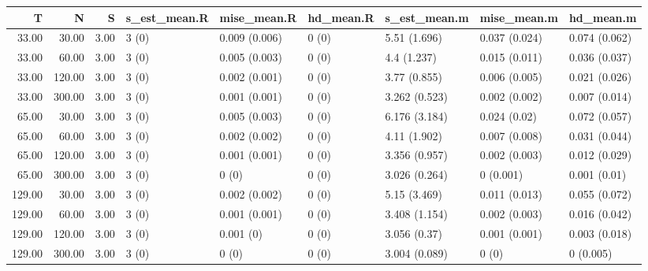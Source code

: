 \begin{table}[ht]
\centering
\begin{tabular}{rrrllllll}
  \hline
T & N & S & s\_est\_mean.R & mise\_mean.R & hd\_mean.R & s\_est\_mean.m & mise\_mean.m & hd\_mean.m \\ 
  \hline
33.00 & 30.00 & 3.00 & 3 (0) & 0.009 (0.006) & 0 (0) & 5.51 (1.696) & 0.037 (0.024) & 0.074 (0.062) \\ 
  33.00 & 60.00 & 3.00 & 3 (0) & 0.005 (0.003) & 0 (0) & 4.4 (1.237) & 0.015 (0.011) & 0.036 (0.037) \\ 
  33.00 & 120.00 & 3.00 & 3 (0) & 0.002 (0.001) & 0 (0) & 3.77 (0.855) & 0.006 (0.005) & 0.021 (0.026) \\ 
  33.00 & 300.00 & 3.00 & 3 (0) & 0.001 (0.001) & 0 (0) & 3.262 (0.523) & 0.002 (0.002) & 0.007 (0.014) \\ 
  65.00 & 30.00 & 3.00 & 3 (0) & 0.005 (0.003) & 0 (0) & 6.176 (3.184) & 0.024 (0.02) & 0.072 (0.057) \\ 
  65.00 & 60.00 & 3.00 & 3 (0) & 0.002 (0.002) & 0 (0) & 4.11 (1.902) & 0.007 (0.008) & 0.031 (0.044) \\ 
  65.00 & 120.00 & 3.00 & 3 (0) & 0.001 (0.001) & 0 (0) & 3.356 (0.957) & 0.002 (0.003) & 0.012 (0.029) \\ 
  65.00 & 300.00 & 3.00 & 3 (0) & 0 (0) & 0 (0) & 3.026 (0.264) & 0 (0.001) & 0.001 (0.01) \\ 
  129.00 & 30.00 & 3.00 & 3 (0) & 0.002 (0.002) & 0 (0) & 5.15 (3.469) & 0.011 (0.013) & 0.055 (0.072) \\ 
  129.00 & 60.00 & 3.00 & 3 (0) & 0.001 (0.001) & 0 (0) & 3.408 (1.154) & 0.002 (0.003) & 0.016 (0.042) \\ 
  129.00 & 120.00 & 3.00 & 3 (0) & 0.001 (0) & 0 (0) & 3.056 (0.37) & 0.001 (0.001) & 0.003 (0.018) \\ 
  129.00 & 300.00 & 3.00 & 3 (0) & 0 (0) & 0 (0) & 3.004 (0.089) & 0 (0) & 0 (0.005) \\ 
   \hline
\end{tabular}
\end{table}
